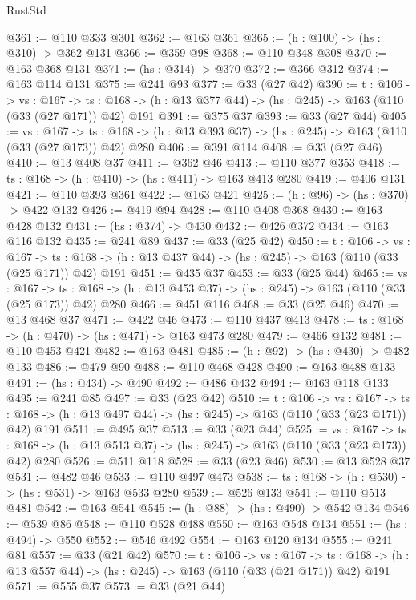 \begin{lexlean}{RustStd}
\begin{coremodule}
@361 := @110 @333 @301
@362 := @163 @361
@365 := (h : @100) -> (hs : @310) -> @362 @131
@366 := @359 @98
@368 := @110 @348 @308
@370 := @163 @368 @131
@371 := (hs : @314) -> @370
@372 := @366 @312
@374 := @163 @114 @131
@375 := @241 @93
@377 := @33 (@27 @42)
@390 := {t : @106} ->
  {vs : @167} ->
  {ts : @168} -> (h : @13 @377 @44) -> (hs : @245) -> @163 (@110 (@33 (@27 @171)) @42) @191
@391 := @375 @37
@393 := @33 (@27 @44)
@405 := {vs : @167} ->
  {ts : @168} -> (h : @13 @393 @37) -> (hs : @245) -> @163 (@110 (@33 (@27 @173)) @42) @280
@406 := @391 @114
@408 := @33 (@27 @46)
@410 := @13 @408 @37
@411 := @362 @46
@413 := @110 @377 @353
@418 := {ts : @168} -> (h : @410) -> (hs : @411) -> @163 @413 @280
@419 := @406 @131
@421 := @110 @393 @361
@422 := @163 @421
@425 := (h : @96) -> (hs : @370) -> @422 @132
@426 := @419 @94
@428 := @110 @408 @368
@430 := @163 @428 @132
@431 := (hs : @374) -> @430
@432 := @426 @372
@434 := @163 @116 @132
@435 := @241 @89
@437 := @33 (@25 @42)
@450 := {t : @106} ->
  {vs : @167} ->
  {ts : @168} -> (h : @13 @437 @44) -> (hs : @245) -> @163 (@110 (@33 (@25 @171)) @42) @191
@451 := @435 @37
@453 := @33 (@25 @44)
@465 := {vs : @167} ->
  {ts : @168} -> (h : @13 @453 @37) -> (hs : @245) -> @163 (@110 (@33 (@25 @173)) @42) @280
@466 := @451 @116
@468 := @33 (@25 @46)
@470 := @13 @468 @37
@471 := @422 @46
@473 := @110 @437 @413
@478 := {ts : @168} -> (h : @470) -> (hs : @471) -> @163 @473 @280
@479 := @466 @132
@481 := @110 @453 @421
@482 := @163 @481
@485 := (h : @92) -> (hs : @430) -> @482 @133
@486 := @479 @90
@488 := @110 @468 @428
@490 := @163 @488 @133
@491 := (hs : @434) -> @490
@492 := @486 @432
@494 := @163 @118 @133
@495 := @241 @85
@497 := @33 (@23 @42)
@510 := {t : @106} ->
  {vs : @167} ->
  {ts : @168} -> (h : @13 @497 @44) -> (hs : @245) -> @163 (@110 (@33 (@23 @171)) @42) @191
@511 := @495 @37
@513 := @33 (@23 @44)
@525 := {vs : @167} ->
  {ts : @168} -> (h : @13 @513 @37) -> (hs : @245) -> @163 (@110 (@33 (@23 @173)) @42) @280
@526 := @511 @118
@528 := @33 (@23 @46)
@530 := @13 @528 @37
@531 := @482 @46
@533 := @110 @497 @473
@538 := {ts : @168} -> (h : @530) -> (hs : @531) -> @163 @533 @280
@539 := @526 @133
@541 := @110 @513 @481
@542 := @163 @541
@545 := (h : @88) -> (hs : @490) -> @542 @134
@546 := @539 @86
@548 := @110 @528 @488
@550 := @163 @548 @134
@551 := (hs : @494) -> @550
@552 := @546 @492
@554 := @163 @120 @134
@555 := @241 @81
@557 := @33 (@21 @42)
@570 := {t : @106} ->
  {vs : @167} ->
  {ts : @168} -> (h : @13 @557 @44) -> (hs : @245) -> @163 (@110 (@33 (@21 @171)) @42) @191
@571 := @555 @37
@573 := @33 (@21 @44)

\end{coremodule}
\end{lexlean}
